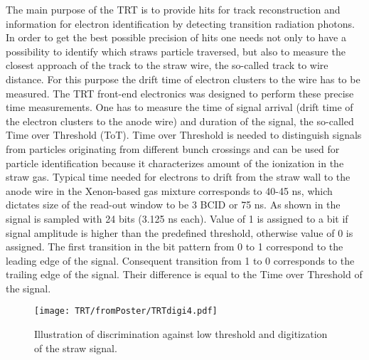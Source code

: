 The main purpose of the TRT is to provide hits for track reconstruction and information for electron identification by detecting transition radiation photons.
In order to get the best possible precision of hits one needs not only to have a possibility to identify which straws particle traversed,
but also to measure the closest approach of the track to the straw wire, the so-called track to wire distance. 
For this purpose the drift time of electron clusters to the wire has to be measured.
The TRT front-end electronics was designed to perform these precise time measurements.
One has to measure the time of signal arrival (drift time of the electron clusters to the anode wire) and duration of the signal, the so-called Time over Threshold (ToT).
Time over Threshold is needed to distinguish signals from particles originating from different bunch crossings 
and can be used for particle identification because it characterizes amount of the ionization in the straw gas.
Typical time needed for electrons to drift from the straw wall to the anode wire in the Xenon-based gas mixture corresponds to 40-45 ns, which dictates size of the read-out window to be 
3 BCID or 75 ns. As shown in  the signal is sampled with 24 bits (3.125 ns each). 
Value of 1 is assigned to a bit if signal amplitude is higher than the predefined threshold, 
otherwise value of 0 is assigned. The first transition in the bit pattern from 0 to 1 correspond to the leading edge of the signal. Consequent transition from 1 to 0 
corresponds to the trailing edge of the signal. Their difference is equal to the Time over Threshold of the signal. 

\begin{figure}
\begin{center}
 \texttt{[image: TRT/fromPoster/TRTdigi4.pdf]}
\caption{Illustration of discrimination against low threshold and digitization of the straw signal.}
\label{fig:pulseDigitization}
\end{center}
\end{figure}


